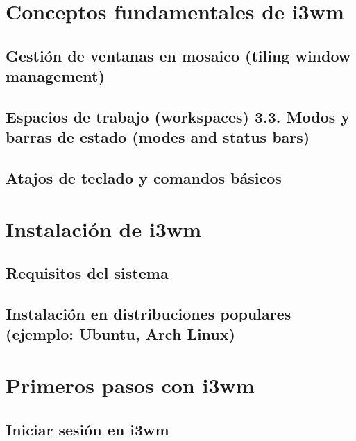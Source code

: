 \documentclass[
  jou,
  floatsintext,
  longtable,
  a4paper,
  nolmodern,
  notxfonts,
  notimes,
  colorlinks=true,linkcolor=blue,citecolor=blue,urlcolor=blue]{apa7}
\begin{document}
\section{Conceptos fundamentales de
i3wm}\label{conceptos-fundamentales-de-i3wm}

\subsection{Gestión de ventanas en mosaico (tiling window
management)}\label{gestiuxf3n-de-ventanas-en-mosaico-tiling-window-management}

\subsection{Espacios de trabajo (workspaces) 3.3. Modos y barras de
estado (modes and status
bars)}\label{espacios-de-trabajo-workspaces-3.3.-modos-y-barras-de-estado-modes-and-status-bars}

\subsection{Atajos de teclado y comandos
básicos}\label{atajos-de-teclado-y-comandos-buxe1sicos}

\section{Instalación de i3wm}\label{instalaciuxf3n-de-i3wm}

\subsection{Requisitos del sistema}\label{requisitos-del-sistema}

\subsection{Instalación en distribuciones populares (ejemplo: Ubuntu,
Arch
Linux)}\label{instalaciuxf3n-en-distribuciones-populares-ejemplo-ubuntu-arch-linux}

\section{Primeros pasos con i3wm}\label{primeros-pasos-con-i3wm}

\subsection{Iniciar sesión en i3wm}\label{iniciar-sesiuxf3n-en-i3wm}
\end{document}
